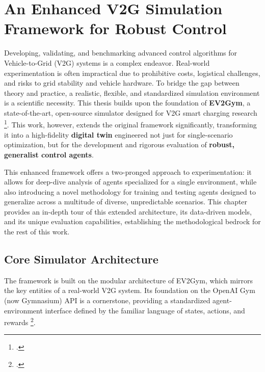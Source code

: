 \chapter{An Enhanced V2G Simulation Framework for Robust Control}
\label{chap:ev2gym}

Developing, validating, and benchmarking advanced control algorithms for Vehicle-to-Grid (V2G) systems is a complex endeavor. Real-world experimentation is often impractical due to prohibitive costs, logistical challenges, and risks to grid stability and vehicle hardware. To bridge the gap between theory and practice, a realistic, flexible, and standardized simulation environment is a scientific necessity. This thesis builds upon the foundation of \textbf{EV2Gym}, a state-of-the-art, open-source simulator designed for V2G smart charging research \footcite{orfanoudakis2024ev2gym}. This work, however, extends the original framework significantly, transforming it into a high-fidelity \textbf{digital twin} engineered not just for single-scenario optimization, but for the development and rigorous evaluation of \textbf{robust, generalist control agents}.

This enhanced framework offers a two-pronged approach to experimentation: it allows for deep-dive analysis of agents specialized for a single environment, while also introducing a novel methodology for training and testing agents designed to generalize across a multitude of diverse, unpredictable scenarios. This chapter provides an in-depth tour of this extended architecture, its data-driven models, and its unique evaluation capabilities, establishing the methodological bedrock for the rest of this work.

\section{Core Simulator Architecture}
The framework is built on the modular architecture of EV2Gym, which mirrors the key entities of a real-world V2G system. Its foundation on the OpenAI Gym (now Gymnasium) API is a cornerstone, providing a standardized agent-environment interface defined by the familiar language of states, actions, and rewards \footcite{brockman2016openai}.

